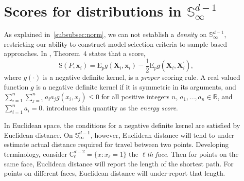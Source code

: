 \section{Scores for distributions in ${\mathbb S}_\infty^{d-1}$\label{sec:evaluation}}

As explained in~\ref{subsubsec:norm}, we can not establish a \emph{density} on ${\mathbb S}_{\infty}^{d-1}$, restricting our ability to construct model selection criteria to sample-based approaches.  In \cite{gneiting2007}, Theorem~4 states that a score,
    \begin{equation}
    \label{eq:es}
    \text{S}\left(P, \bm{x}_i\right) =  \text{E}_p g\left(\bm{X}_i, \bm{x}_i\right) -
                                    \frac{1}{2}\text{E}_p g\left(\bm{X}_i,\bm{X}_i^{\prime}\right),
    \end{equation}
where $g(\cdot)$ is a negative definite kernel, is a \emph{proper} scoring rule.  A real valued function $g$ is a negative definite kernel if it is symmetric in its arguments, and $\sum_{i=1}^n\sum_{j=1}^na_ia_jg(x_i,x_j)\leq 0$ for all positive integers $n$, $a_1,\ldots,a_n\in{\mathbb R}$, and $\sum_{i = 1}^na_i = 0$. \cite{gneiting2007} introduces this quantity as the \emph{energy score}.  

In Euclidean space, the conditions for a negative definite kernel are satisfied by Euclidean distance.  On ${\mathbb S}_{\infty}^{d-1}$, however, Euclidean distance will tend to under-estimate actual distance required for travel between two points.  Developing terminology, consider ${\mathbb C}_{\ell}^{d-2} = \lbrace x : x_{\ell} = 1\rbrace$ the \emph{$\ell$th face}.  Then for points on the same face, Euclidean distance will report the length of the shortest path.  For points on different faces, Euclidean distance will under-report that length.

